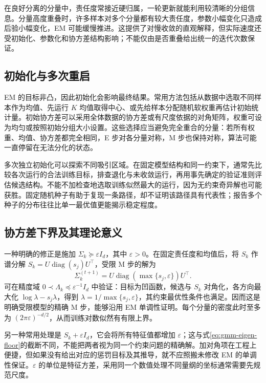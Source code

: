 \documentclass[UTF8,12pt,a4paper,fontset=fandol]{ctexart}
\begin{document}
在良好分离的分量中，责任度常接近硬归属，一轮更新就能利用较清晰的分组信息。分量高度重叠时，许多样本对多个分量都有较大责任度，参数小幅变化只造成后验小幅变化，EM 可能缓慢推进。这提供了对慢收敛的直观解释，但实际速度还受初始化、参数化和协方差结构影响；不能仅由是否重叠给出统一的迭代次数保证。

\subsection{初始化与多次重启}
EM 的目标非凸，因此初始化会影响最终结果。常用方法包括从数据中选取不同样本作为均值、先运行 $K$ 均值取得中心、或先给样本分配随机软权重再估计初始统计量。初始协方差可以采用全体数据的协方差或有尺度依据的对角矩阵，权重可设为均匀或按照初始分组大小设置。这些选择应当避免完全重合的分量：若所有权重、均值、协方差都完全相同，E 步对各分量对称，M 步也保持对称，算法可能一直停留在无法分化的状态。

多次独立初始化可以探索不同吸引区域。在固定模型结构和同一约束下，通常先比较各次运行的合法训练目标，排查退化与未收敛运行，再用事先确定的验证准则评估候选结构。不能不加检查地选取训练似然最大的运行，因为无约束奇异解也可能获胜。固定随机种子有助于复现一条路径，却不证明该路径具有代表性；报告多个种子的分布往往比单一最优值更能揭示稳定程度。

\subsection{协方差下界及其理论意义}
一种明确的修正是施加 $\Sigma_k\succeq\varepsilon I_d$，其中 $\varepsilon>0$。在固定责任度和均值后，将 $S_k$ 作谱分解 $S_k=U\operatorname{diag}(s_j)U^\top$，受限 M 步的解为
\begin{equation}
\Sigma_k^{(t+1)}=U\operatorname{diag}(\max\{s_j,\varepsilon\})U^\top.
\label{eq:gmm-eigen-floor}
\end{equation}
可在精度域 $0\prec\Lambda_k\preceq\varepsilon^{-1}I_d$ 中验证：目标为凹函数，候选与 $S_k$ 对角化，各方向最大化 $\log\lambda-s_j\lambda$，得到 $\lambda=1/\max\{s_j,\varepsilon\}$，其约束最优性条件也满足。因而这是明确受限模型的精确 M 步，能够沿用 EM 单调性证明。每个分量的密度此时至多为 $(2\pi\varepsilon)^{-d/2}$，从而训练对数似然有有限上界。

另一种常用处理是 $S_k+\varepsilon I_d$，它会将所有特征值都增加 $\varepsilon$；这与式\eqref{eq:gmm-eigen-floor}的截断不同，不能把两者视为同一个约束问题的精确解。加对角项在工程上便捷，但如果没有给出对应的惩罚目标及其推导，就不应照搬未修改 EM 的单调性保证。$\varepsilon$ 的单位是特征方差，采用同一个数值处理不同量纲的坐标通常需要先规范尺度。
\end{document}

